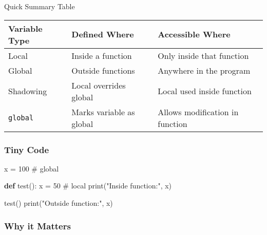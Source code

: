 \documentclass[
  letterpaper,
  DIV=11,
  numbers=noendperiod]{scrreprt}
\newenvironment{Shaded}{\begin{snugshade}}{\end{snugshade}}
\newcommand{\BuiltInTok}[1]{\textcolor[rgb]{0.00,0.23,0.31}{#1}}
\newcommand{\CommentTok}[1]{\textcolor[rgb]{0.37,0.37,0.37}{#1}}
\newcommand{\DecValTok}[1]{\textcolor[rgb]{0.68,0.00,0.00}{#1}}
\newcommand{\KeywordTok}[1]{\textcolor[rgb]{0.00,0.23,0.31}{\textbf{#1}}}
\newcommand{\NormalTok}[1]{\textcolor[rgb]{0.00,0.23,0.31}{#1}}
\newcommand{\OperatorTok}[1]{\textcolor[rgb]{0.37,0.37,0.37}{#1}}
\newcommand{\StringTok}[1]{\textcolor[rgb]{0.13,0.47,0.30}{#1}}
\begin{document}
Quick Summary Table

\begin{longtable}[]{@{}
  >{\raggedright\arraybackslash}p{}
  >{\raggedright\arraybackslash}p{}
  >{\raggedright\arraybackslash}p{}@{}}
\toprule\noalign{}
\begin{minipage}[b]{\linewidth}\raggedright
Variable Type
\end{minipage} & \begin{minipage}[b]{\linewidth}\raggedright
Defined Where
\end{minipage} & \begin{minipage}[b]{\linewidth}\raggedright
Accessible Where
\end{minipage} \\
\midrule\noalign{}
\endhead
\bottomrule\noalign{}
\endlastfoot
Local & Inside a function & Only inside that function \\
Global & Outside functions & Anywhere in the program \\
Shadowing & Local overrides global & Local used inside function \\
\texttt{global} & Marks variable as global & Allows modification in
function \\
\end{longtable}

\subsubsection{Tiny Code}\label{tiny-code-34}

\begin{Shaded}
\begin{Highlighting}[]
\NormalTok{x }\OperatorTok{=} \DecValTok{100}   \CommentTok{\# global}

\KeywordTok{def}\NormalTok{ test():}
\NormalTok{    x }\OperatorTok{=} \DecValTok{50}   \CommentTok{\# local}
    \BuiltInTok{print}\NormalTok{(}\StringTok{"Inside function:"}\NormalTok{, x)}

\NormalTok{test()}
\BuiltInTok{print}\NormalTok{(}\StringTok{"Outside function:"}\NormalTok{, x)}
\end{Highlighting}
\end{Shaded}

\subsubsection{Why it Matters}\label{why-it-matters-34}
\end{document}
